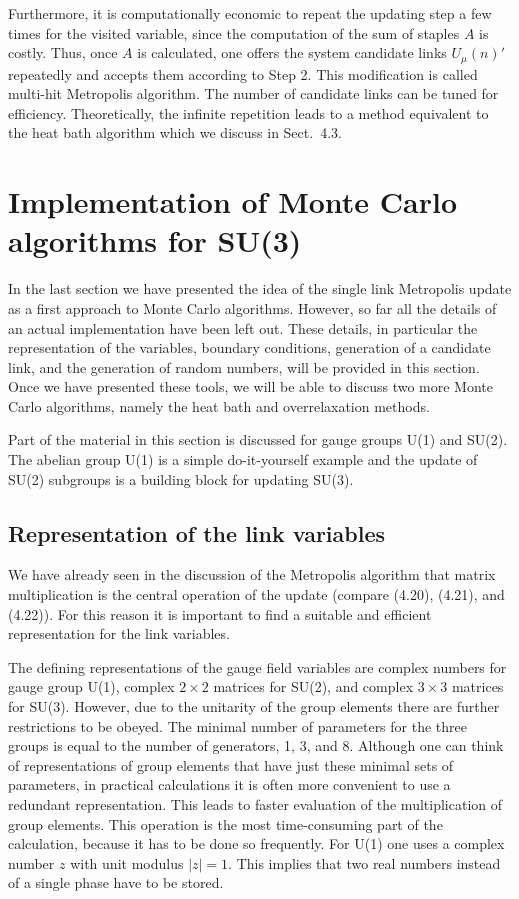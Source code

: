 Furthermore, it is computationally economic to repeat the updating step a
few times for the visited variable, since the computation of the sum of staples
$A$ is costly. Thus, once $A$ is calculated, one offers the system candidate links
$U_\mu(n)'$ repeatedly and accepts them according to Step 2. This modification is
called multi-hit Metropolis algorithm. The number of candidate links can be
tuned for efficiency. Theoretically, the infinite repetition leads to a method
equivalent to the heat bath algorithm which we discuss in Sect.~4.3.

\section{Implementation of Monte Carlo algorithms for SU(3)}

In the last section we have presented the idea of the single link Metropolis
update as a first approach to Monte Carlo algorithms. However, so far all
the details of an actual implementation have been left out. These details, in
particular the representation of the variables, boundary conditions, generation
of a candidate link, and the generation of random numbers, will be provided
in this section. Once we have presented these tools, we will be able to discuss
two more Monte Carlo algorithms, namely the heat bath and overrelaxation
methods.

Part of the material in this section is discussed for gauge groups U(1) and
SU(2). The abelian group U(1) is a simple do-it-yourself example and the
update of SU(2) subgroups is a building block for updating SU(3).

\subsection{Representation of the link variables}

We have already seen in the discussion of the Metropolis algorithm that matrix
multiplication is the central operation of the update (compare (4.20), (4.21),
and (4.22)). For this reason it is important to find a suitable and efficient
representation for the link variables.

The defining representations of the gauge field variables are complex numbers for gauge group U(1), complex $2\times2$ matrices for SU(2), and complex $3\times3$
matrices for SU(3). However, due to the unitarity of the group elements there
are further restrictions to be obeyed. The minimal number of parameters for
the three groups is equal to the number of generators, 1, 3, and 8. Although
one can think of representations of group elements that have just these minimal sets of parameters, in practical calculations it is often more convenient to
use a redundant representation. This leads to faster evaluation of the multiplication of group elements. This operation is the most time-consuming part
of the calculation, because it has to be done so frequently. For U(1) one uses
a complex number $z$ with unit modulus $|z| = 1$. This implies that two real
numbers instead of a single phase have to be stored.

